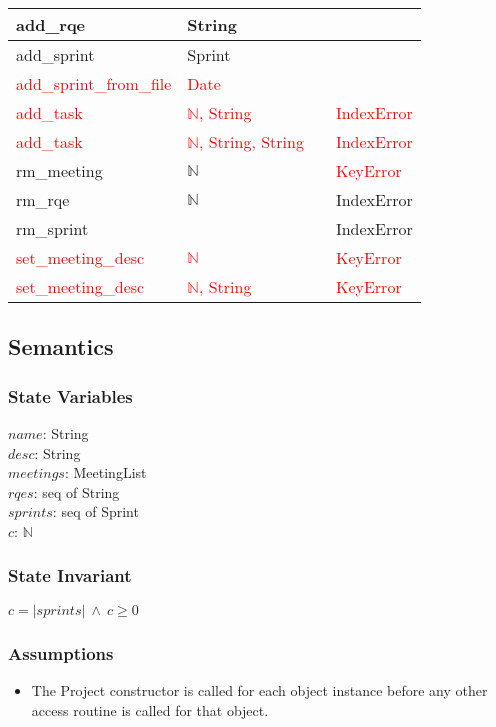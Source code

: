\documentclass[12pt, titlepage]{article}
\begin{document}
\begin{tabular}{|l|l|l|l|}
    \hline
    add\_rqe & String & & \\
    \hline
    add\_sprint & Sprint & & \\
    \hline
    \textcolor{red}{add\_sprint\_from\_file} & \textcolor{red}{Date} & & \\
    \hline
    \textcolor{red}{add\_task} & \textcolor{red}{$\mathbb{N}$, String}& & \textcolor{red}{IndexError}\\
    \hline
    \textcolor{red}{add\_task} & \textcolor{red}{$\mathbb{N}$, String, String}& & \textcolor{red}{IndexError}\\
    \hline
    rm\_meeting & $\mathbb{N}$ &  & \textcolor{red}{KeyError}\\
    \hline
    rm\_rqe & $\mathbb{N}$ &  & IndexError\\
    \hline
    rm\_sprint & & & IndexError\\
    \hline
    \textcolor{red}{set\_meeting\_desc} & \textcolor{red}{$\mathbb{N}$} & & \textcolor{red}{KeyError}\\
    \hline
    \textcolor{red}{set\_meeting\_desc} & \textcolor{red}{$\mathbb{N}$, String} & &\textcolor{red}{KeyError}\\
    \hline
\end{tabular}

\subsection*{Semantics}
\subsubsection*{State Variables}
$name$: String\\
$desc$: String\\
$meetings$: MeetingList\\
$rqes$: seq of String\\
$sprints$: seq of Sprint\\
$c$: $\mathbb{N}$

\subsubsection*{State Invariant}
$c = |sprints|\ \land\ c \geq 0$ 

\subsubsection*{Assumptions}
\begin{itemize}
  \item The Project constructor is called for each object instance before any other access routine is called for that object.
\end{itemize}
\end{document}

